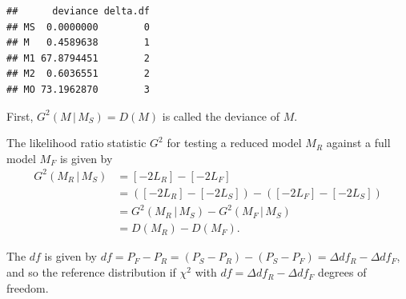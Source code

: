\documentclass[
  11pt,
]{article}
\newenvironment{Shaded}{\begin{snugshade}}{\end{snugshade}}
\newcommand{\AttributeTok}[1]{\textcolor[rgb]{0.13,0.29,0.53}{#1}}
\newcommand{\CommentTok}[1]{\textcolor[rgb]{0.56,0.35,0.01}{\textit{#1}}}
\newcommand{\DecValTok}[1]{\textcolor[rgb]{0.00,0.00,0.81}{#1}}
\newcommand{\FloatTok}[1]{\textcolor[rgb]{0.00,0.00,0.81}{#1}}
\newcommand{\FunctionTok}[1]{\textcolor[rgb]{0.13,0.29,0.53}{\textbf{#1}}}
\newcommand{\NormalTok}[1]{#1}
\newcommand{\OtherTok}[1]{\textcolor[rgb]{0.56,0.35,0.01}{#1}}
\newcommand{\SpecialCharTok}[1]{\textcolor[rgb]{0.81,0.36,0.00}{\textbf{#1}}}
\newcommand{\StringTok}[1]{\textcolor[rgb]{0.31,0.60,0.02}{#1}}
\begin{document}
\begin{Shaded}
\end{Shaded}

\begin{verbatim}
##      deviance delta.df
## MS  0.0000000        0
## M   0.4589638        1
## M1 67.8794451        2
## M2  0.6036551        2
## MO 73.1962870        3
\end{verbatim}

First, \(G^2(M\,|\,M_S) = D(M)\) is called the deviance of \(M\).

The likelihood ratio statistic \(G^2\) for testing a reduced model
\(M_R\) against a full model \(M_F\) is given by \begin{align}
  G^2(M_R\,|\,M_S)
    &= [-2 L_R]-[-2 L_F]\\
    &= \left([-2 L_R]-[-2 L_S]\right)-\left([-2 L_F]-[-2 L_S] \right)\\
    &= G^2(M_R\,|\,M_S)-G^2(M_F\,|\,M_S)\\
    &= D(M_R) - D(M_F).
\end{align}

The \(df\) is given by
\(df = P_F - P_R = (P_S - P_R) - (P_S - P_F) = \Delta df_R - \Delta df_F\),
and so the reference distribution if \(\chi^2\) with
\(df = \Delta df_R - \Delta df_F\) degrees of freedom.
\end{document}
